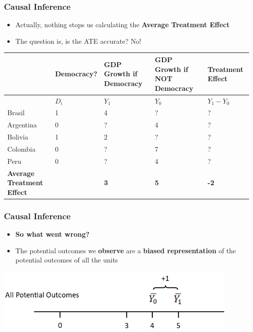 \documentclass[xcolor=x11names,compress]{beamer}\usepackage[]{graphicx}\usepackage[]{color}
\renewcommand{\(}{\begin{columns}}
\renewcommand{\)}{\end{columns}}
\newcommand{\<}[1]{\begin{column}{#1}}
\renewcommand{\>}{\end{column}}
\begin{document}
\begin{frame}
\frametitle{Causal Inference}
\begin{itemize}
\item Actually, nothing stops us calculating the \textbf{Average Treatment Effect}
\pause
\item The question is, is the ATE accurate? \pause No!
\pause
\end{itemize}
\footnotesize
\begin{table}[htbp]
  \centering
    \begin{tabular}{|p{1.8cm}|p{1.8cm}|p{2cm}|p{2cm}|p{2cm}|}
    \hline
          & \multicolumn{1}{p{1.8cm}|}{Democracy?} & \multicolumn{1}{p{2cm}|}{GDP Growth if Democracy} & \multicolumn{1}{p{2.2cm}|}{GDP Growth if NOT Democracy} & \textbf{Treatment Effect} \bigstrut\\
    \hline
          & \multicolumn{1}{p{1.8cm}|}{$D_i$} & \multicolumn{1}{p{2cm}|}{$Y_1$} & \multicolumn{1}{p{2.2cm}|}{$Y_0$} & \multicolumn{1}{p{1.8cm}|}{$Y_{1} - Y_{0}$} \bigstrut\\
    \hline
    Brasil & 1 & 4     & ?      & ? \bigstrut\\
    \hline
    Argentina & 0 & ?    & 4      & ? \bigstrut\\
    \hline
    Bolivia & 1 & 2     & ?     & ? \bigstrut\\
    \hline
    Colombia & 0 &  ?   & 7    & ? \bigstrut\\
    \hline
    Peru & 0 & ?     & 4     & ? \bigstrut\\
    \hline
    \textbf{Average Treatment Effect} & & \textbf{3} & \textbf{5} & \textbf{-2} \bigstrut\\
    \hline
    \end{tabular}%
  \label{tab:addlabel}%
\end{table}%
\normalsize
\end{frame}

\begin{frame}
\frametitle{Causal Inference}
\begin{itemize}
\item \textbf{So what went wrong?}
\pause
\item The potential outcomes we \textbf{observe} are a \textbf{biased representation} of the potential outcomes of all the units
\pause
\end{itemize}
\includegraphics[width=0.9\textwidth]{PO_number_line_1.png}
\end{frame}
\end{document}
